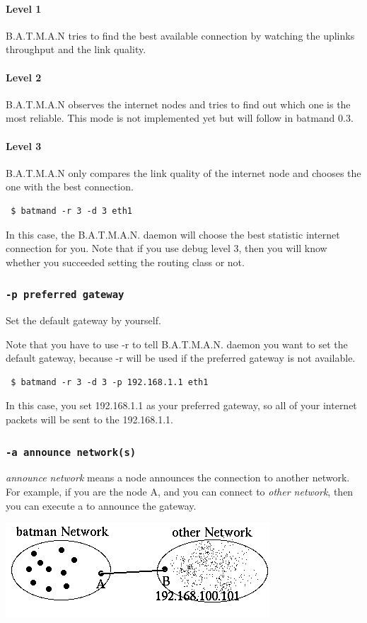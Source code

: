 \documentclass[
	12pt,
	a4paper,
	twoside,
	english,
	headsepline,
	footnosepline,
	automark,
	normalheadings,
	openany,
	cleardoubleplain,
	abstracton,
	idxtotoc,
	liststotoc,
	bibtotoc,
 	BCOR8mm,
]{scrartcl}
\newcommand{\subsubsectionttt}[1]{\subsubsection{\texttt{#1}}}
\begin{document}
\paragraph*{Level 1}
B.A.T.M.A.N tries to find the best available connection by watching the uplinks  throughput and the link quality.

\paragraph*{Level 2}
B.A.T.M.A.N observes the internet nodes and tries to find out which one is the  most reliable. This mode is not implemented yet but will follow in batmand 0.3.

\paragraph*{Level 3}
B.A.T.M.A.N only compares the link quality of the internet node and chooses the  one with the best connection.

\begin{verbatim}
 $ batmand -r 3 -d 3 eth1
\end{verbatim}
In this case, the B.A.T.M.A.N. daemon will choose the best statistic internet connection for you. Note that if you use debug level 3, then you will know whether you succeeded setting the  routing class or not.

\subsubsectionttt{-p preferred gateway}
Set the default gateway  by yourself.

Note that you have to use -r to tell B.A.T.M.A.N. daemon you want to set the default gateway,  because  -r will be used if the preferred gateway is not available.

\begin{verbatim}
 $ batmand -r 3 -d 3 -p 192.168.1.1 eth1
\end{verbatim}
In this case, you set 192.168.1.1 as your preferred gateway, so all of your internet packets will  be sent to the 192.168.1.1.

\subsubsectionttt{-a announce network(s)}
\emph{announce network} means a node announces the connection to another network. For example, if you are the node A, and you can connect to \emph{other network}, then you can  execute  a to announce the gateway.

\begin{center}
\includegraphics[scale=0.8]{announce_networks}
\end{center}
\end{document}
